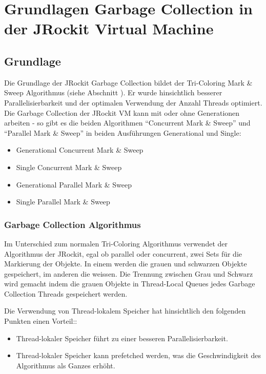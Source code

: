 \chapter{Grundlagen Garbage Collection in der JRockit Virtual Machine}\label{jrockit garbage collection}
\section{Grundlage}
Die Grundlage der JRockit Garbage Collection bildet der Tri-Coloring Mark \& Sweep Algorithmus (siehe Abschnitt ). Er wurde hinsichtlich besserer Parallelisierbarkeit und der optimalen Verwendung der Anzahl Threads optimiert. Die Garbage Collection der JRockit VM kann mit oder ohne Generationen arbeiten - so gibt es die beiden Algorithmen ``Concurrent Mark \& Sweep'' und ``Parallel Mark \& Sweep'' in beiden Ausführungen Generational und Single:

\begin{itemize}
	\item Generational Concurrent Mark \& Sweep
	\item Single Concurrent Mark \& Sweep
	\item Generational Parallel Mark \& Sweep	
	\item Single Parallel Mark \& Sweep
\end{itemize}

\subsection{Garbage Collection Algorithmus}
Im Unterschied zum normalen Tri-Coloring Algorithmus verwendet der Algorithmus der JRockit, egal ob parallel oder concurrent, zwei Sets für die Markierung der Objekte. In einem werden die grauen und schwarzen Objekte gespeichert, im anderen die weissen. Die Trennung zwischen Grau und Schwarz wird gemacht indem die grauen Objekte in Thread-Local Queues jedes Garbage Collection Threads gespeichert werden. 

Die Verwendung von Thread-lokalem Speicher hat hinsichtlich den folgenden Punkten einen Vorteil:\cite[S. 79]{lagergren2010oracle}:
\begin{itemize}
	\item Thread-lokaler Speicher führt zu einer besseren Parallelisierbarkeit.
	\item Thread-lokaler Speicher kann prefetched werden, was die Geschwindigkeit des Algorithmus als Ganzes erhöht.
\end{itemize}

